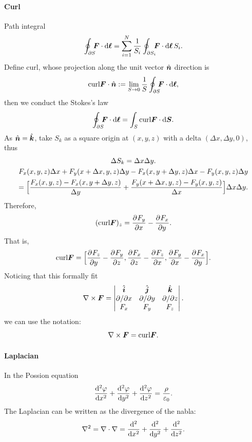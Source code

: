 \documentclass{article}
\newcommand{\ko}[1]{\hspace{-#1 pt}}
\begin{document}
\paragraph{Curl} Path integral
$$\oint_{\partial S}\ko5\bm F\cdot\d\bm\ell=\sum_{i=1}^N\frac1{S_i}\oint_{\partial S_i}\ko5\bm F\cdot\d\bm\ell\,S_i.$$
Define curl, whose projection along the unit vector $\uvec{n}$ direction is
$$\text{curl}\bm F\cdot\uvec{n}:=\lim_{S\to0}\frac1S\oint_{\partial S}\ko5\bm F\cdot\d\bm\ell,$$
then we conduct the Stokes's law
$$\oint_{\partial S}\ko5\bm F\cdot\d\bm\ell=\int_S\text{curl}\bm F\cdot\d\bm S.$$
As $\uvec{n}=\uvec{k}$, take $S_k$ as a square origin at $(x,y,z)$ with a delta $(\Delta x,\Delta y,0)$, thus
\begin{gather*}
	\Delta S_k=\Delta x\Delta y.\\
	F_x(x,y,z)\Delta x+F_y(x+\Delta x,y,z)\Delta y-F_x(x,y+\Delta y,z)\Delta x-F_y(x,y,z)\Delta y\\
	=\Bigb{\frac{F_x(x,y,z)-F_x(x,y+\Delta y,z)}{\Delta y}+\frac{F_y(x+\Delta x,y,z)-F_y(x,y,z)}{\Delta x}}\Delta x\Delta y.
\end{gather*}
Therefore,
$$(\text{curl}\bm F)_z=\pv{F_y}x-\pv{F_x}y.$$
That is,
$$\text{curl}\bm F=\Bigb{\pv{F_z}y-\pv{F_y}z,\pv{F_x}z-\pv{F_z}x,\pv{F_y}x-\pv{F_x}y}.$$
Noticing that this formally fit
\begin{align*}
	\curl\bm F=
	\begin{vmatrix}
		\uvec{i}         & \uvec{j}         & \uvec{k}         \\
		\partial/\partial x & \partial/\partial y & \partial/\partial z \\
		F_x                 & F_y                 & F_z
	\end{vmatrix}.
\end{align*}
we can use the notation:
$$\curl\bm F=\text{curl}\bm F.$$
\paragraph{Laplacian}In the Possion equation
$$\dv[2]{\varphi}x+\dv[2]{\varphi}y+\dv[2]{\varphi}z=\frac\rho{\varepsilon_0}.$$
The Laplacian can be written as the divergence of the nabla:
$$\laplacian=\div\nabla=\dd[2]x+\dd[2]y+\dd[2]z.$$
\end{document}

